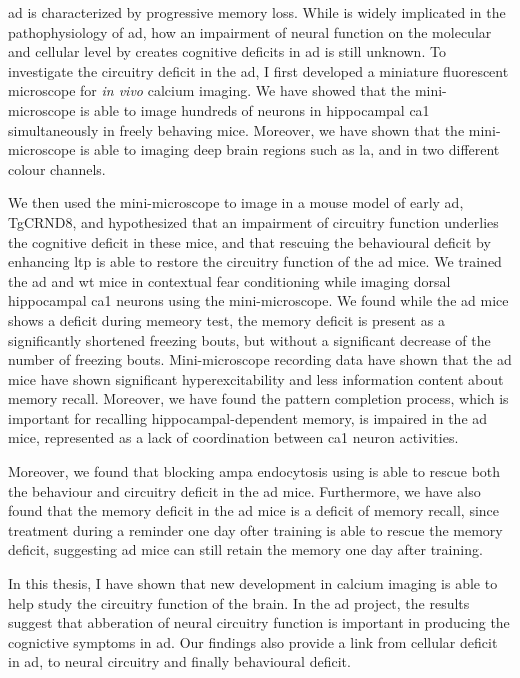 \Gls{ad} is characterized by progressive memory loss. While \abeta{} is widely implicated in the pathophysiology of \gls{ad}, how an impairment of neural function on the molecular and cellular level by \abeta{} creates cognitive deficits in \gls{ad} is still unknown. To investigate the circuitry deficit in the \gls{ad}, I first developed a miniature fluorescent microscope for \textit{in vivo} calcium imaging. We have showed that the mini-microscope is able to image hundreds of neurons in hippocampal \gls{ca1} simultaneously in freely behaving mice. Moreover, we have shown that the mini-microscope is able to imaging deep brain regions such as \gls{la}, and in two different colour channels. 

We then used the mini-microscope to image in a mouse model of early \gls{ad}, TgCRND8, and hypothesized that an impairment of circuitry function underlies the cognitive deficit in these mice, and that rescuing the behavioural deficit by enhancing \gls{ltp} is able to restore the circuitry function of the \gls{ad} mice. We trained the \gls{ad} and \gls{wt} mice in contextual fear conditioning while imaging dorsal hippocampal \gls{ca1} neurons using the mini-microscope. We found while the \gls{ad} mice shows a deficit during memeory test, the memory deficit is present as a significantly shortened freezing bouts, but without a significant decrease of the number of freezing bouts. Mini-microscope recording data have shown that the \gls{ad} mice have shown significant hyperexcitability and less information content about memory recall. Moreover, we have found the pattern completion process, which is important for recalling hippocampal-dependent memory, is impaired in the \gls{ad} mice, represented as a lack of coordination between \gls{ca1} neuron activities. 

Moreover, we found that blocking \gls{ampa} endocytosis using \tglu{} is able to rescue both the behaviour and circuitry deficit in the \gls{ad} mice. Furthermore, we have also found that the memory deficit in the \gls{ad} mice is a deficit of memory recall, since \tglu treatment during a reminder one day ofter training is able to rescue the memory deficit, suggesting \gls{ad} mice can still retain the memory one day after training. 

In this thesis, I have shown that new development in calcium imaging is able to help study the circuitry function of the brain. In the \gls{ad} project, the results suggest that abberation of neural circuitry function is important in producing the cognictive symptoms in \gls{ad}. Our findings also provide a link from cellular deficit in \gls{ad}, to neural circuitry and finally behavioural deficit. 


